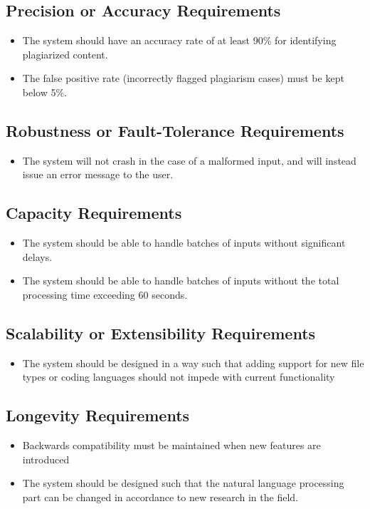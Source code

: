 \documentclass[12pt]{article}
\begin{document}
\subsection{Precision or Accuracy Requirements}
\begin{itemize}
    \item The system should have an accuracy rate of at least 90\% for identifying plagiarized content.
    \item The false positive rate (incorrectly flagged plagiarism cases) must be kept below 5\%.
\end{itemize}
\subsection{Robustness or Fault-Tolerance Requirements}
\begin{itemize}
    \item The system will not crash in the case of a malformed input, and will instead issue an error message to the user.
\end{itemize}
\subsection{Capacity Requirements}
\begin{itemize}
    \item The system should be able to handle batches of inputs without significant delays.
    \item The system should be able to handle batches of inputs without the total processing time exceeding 60 seconds.
\end{itemize}
\subsection{Scalability or Extensibility Requirements}
\begin{itemize}
    \item The system should be designed in a way such that adding support for new file types or coding languages should not impede with current functionality
\end{itemize}
\subsection{Longevity Requirements}
\begin{itemize}
    \item Backwards compatibility must be maintained when new features are introduced
    \item The system should be designed such that the natural language processing part can be changed in accordance to new research in the field.
\end{itemize}
\end{document}
